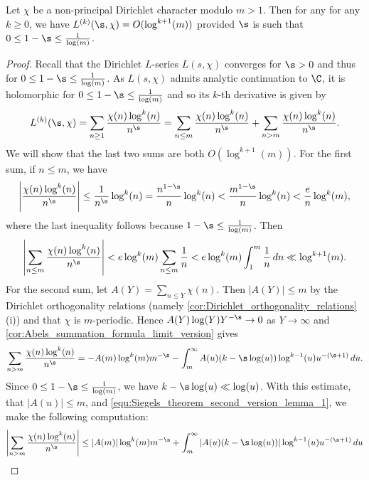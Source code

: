     \begin{lemma}\label{lem:log_growth_of_Dirichlet_L-series_near_1}
      Let \(\chi\) be a non-principal Dirichlet character modulo \(m > 1\). Then for any for any \(k \ge 0\), we have \(L^{(k)}(\s,\chi) = O(\log^{k+1}(m))\) provided \(\s\) is such that \(0 \le 1-\s \le \frac{1}{\log(m)}\).
    \end{lemma}
    \begin{proof}
      Recall that the Dirichlet \(L\)-series \(L(s,\chi)\) converges for \(\s > 0\) and thus for \(0 \le 1-\s \le \frac{1}{\log(m)}\). As \(L(s,\chi)\) admits analytic continuation to \(\C\), it is holomorphic for \(0 \le 1-\s \le \frac{1}{\log(m)}\) and so its \(k\)-th derivative is given by
      \[
        L^{(k)}(\s,\chi) = \sum_{n \ge 1}\frac{\chi(n)\log^{k}(n)}{n^{\s}} = \sum_{n \le m}\frac{\chi(n)\log^{k}(n)}{n^{\s}}+\sum_{n > m}\frac{\chi(n)\log^{k}(n)}{n^{\s}}.
      \]
      We will show that the last two sums are both \(O(\log^{k+1}(m))\). For the first sum, if \(n \le m\), we have
      \[
        \left|\frac{\chi(n)\log^{k}(n)}{n^{\s}}\right| \le \frac{1}{n^{\s}}\log^{k}(n) = \frac{n^{1-\s}}{n}\log^{k}(n) < \frac{m^{1-\s}}{n}\log^{k}(n) < \frac{e}{n}\log^{k}(m),
      \]
      where the last inequality follows because \(1-\s \le \frac{1}{\log(m)}\). Then
      \[
        \left|\sum_{n \le m}\frac{\chi(n)\log^{k}(n)}{n^{\s}}\right| < e\log^{k}(m)\sum_{n \le m}\frac{1}{n} < e\log^{k}(m)\int_{1}^{m}\frac{1}{n}\,dn \ll \log^{k+1}(m).
      \]
      For the second sum, let \(A(Y) = \sum_{n \le Y}\chi(n)\). Then \(|A(Y)| \le m\) by the Dirichlet orthogonality relations (namely \cref{cor:Dirichlet_orthogonality_relations} (i)) and that \(\chi\) is \(m\)-periodic. Hence \(A(Y)\log(Y)Y^{-\s} \to 0\) as \(Y \to \infty\) and \cref{cor:Abels_summation_formula_limit_version} gives
      \begin{equation}\label{equ:Siegels_theorem_second_version_lemma_1}
        \sum_{n > m}\frac{\chi(n)\log^{k}(n)}{n^{\s}} = -A(m)\log^{k}(m)m^{-\s}-\int_{m}^{\infty}A(u)(k-\s\log(u))\log^{k-1}(u)u^{-(\s+1)}\,du.
      \end{equation}
      Since \(0 \le 1-\s \le \frac{1}{\log(m)}\), we have \(k-\s\log(u) \ll \log(u)\). With this estimate, that \(|A(u)| \le m\), and \cref{equ:Siegels_theorem_second_version_lemma_1}, we make the following computation:
      \begin{align*}
        \left|\sum_{n > m}\frac{\chi(n)\log^{k}(n)}{n^{\s}}\right| &\le |A(m)|\log^{k}(m)m^{-\s}+\int_{m}^{\infty}|A(u)(k-\s\log(u))|\log^{k-1}(u)u^{-(\s+1)}\,du \\

\end{align*}
\end{proof}
